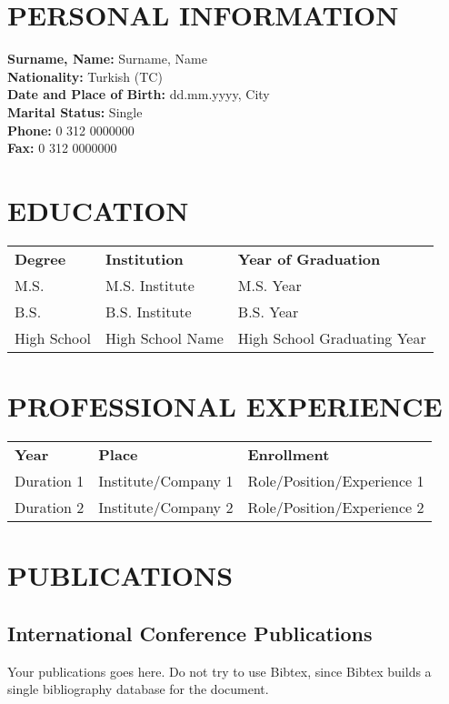\curriculumvitae
\label{chapter:vita}

\section*{\uppercase{Personal Information}}

\textbf{Surname, Name: } Surname, Name\\
\textbf{Nationality:} Turkish (TC) \\
\textbf{Date and Place of Birth:} dd.mm.yyyy, City\\
\textbf{Marital Status:} Single \\
\textbf{Phone:} 0 312 0000000 \\
\textbf{Fax:} 0 312 0000000 \\

\section*{\uppercase{Education}}

\begin{tabular}{lll}
\textbf{Degree} & \textbf{Institution} & \textbf{Year of Graduation} \\
M.S. & M.S. Institute & M.S. Year \\
B.S. & B.S. Institute & B.S. Year \\
High School & High School Name & High School Graduating Year
\end{tabular}

\section*{\uppercase{Professional Experience}}

\begin{tabular}{lll}
\textbf{Year} & \textbf{Place} & \textbf{Enrollment} \\
Duration 1 & Institute/Company 1 & Role/Position/Experience 1 \\
Duration 2 & Institute/Company 2 & Role/Position/Experience 2 
\end{tabular}

\section*{\uppercase{Publications}}
\subsection*{International Conference Publications}
Your publications goes here. Do not try to use Bibtex, since Bibtex builds a single bibliography
database for the document.
